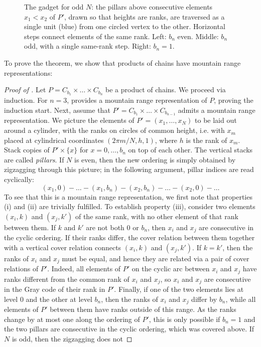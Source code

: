 \documentclass[fontsize=11pt,a4paper,DIV=12]{scrartcl}
\begin{document}
\begin{figure}
	\centering
	
	\caption{The gadget for odd $N$: the pillars above consecutive elements $x_1<x_2$ of $P'$, drawn so that heights are ranks, are traversed as a single unit (blue) from one circled vertex to the other. Horizontal steps connect elements of the same rank. Left: $b_n$ even. Middle: $b_n$ odd, with a single same-rank step. Right: $b_n=1$.}
	\label{fig:gadget}
\end{figure}
To prove the theorem, we show that products of chains have mountain range representations:
\begin{proof}[Proof of ]
	Let $P=C_{b_1}\times\ldots\times C_{b_n}$ be a product of chains. We proceed via
	induction. For $n=3$,  provides a mountain range representation of $P$, proving the induction start.
	Next, assume that $P'=C_{b_1}\times\ldots\times C_{b_{n-1}}$ admits a mountain range
	representation. We picture the elements of $P'=(x_1,\ldots,x_N)$ to be laid out around a cylinder, with the ranks on circles of
	common height, i.e. with $x_m$ placed at cylindrical coordinates $(2\pi m/N, h,1)$, where $h$ is the rank of
    $x_m$. Stack copies of $P'\times\{x\}$ for $x=0,\ldots,b_n$ on top of each other. The vertical stacks are called \emph{pillars}. If $N$ is
	even, then the new ordering is simply obtained by zigzagging through this picture; in the following argument, pillar indices are read cyclically:
	\[(x_1,0)-\ldots-(x_1,b_n)-(x_2,b_n)-\ldots-(x_2,0)-\ldots\]
	To see that this is a mountain range representation, we first note that properties (i) and (ii)
	are
	trivially fulfilled. To establish property (iii), consider two elements $(x_i,k)$ and $(x_j,k')$
	of the same rank, with no other element of that rank between them. If $k$ and $k'$ are not both
	$0$ or $b_n$, then $x_i$ and $x_j$ are consecutive in the cyclic ordering. If their ranks differ, the cover relation between them together with a vertical cover relation connects $(x_i,k)$ and $(x_j,k')$. If $k=k'$, then the ranks of $x_i$ and $x_j$ must be equal, and hence they
	are related via a pair of cover relations of $P'$. Indeed, all elements of $P'$ on the cyclic arc between $x_i$ and $x_j$ have ranks different from the common rank of $x_i$ and $x_j$, so $x_i$ and $x_j$ are consecutive in the Gray code of their rank in $P'$. Finally, if one of the two elements lies at level $0$ and the other at level $b_n$, then the ranks of $x_i$ and $x_j$ differ by $b_n$, while all elements of $P'$ between them have ranks outside of this range. As the ranks change by at most one along the ordering of $P'$, this is only possible if $b_n=1$ and the two pillars are consecutive in the cyclic ordering, which was covered above. If $N$ is odd, then the zigzagging does not

\end{proof}
\end{document}
